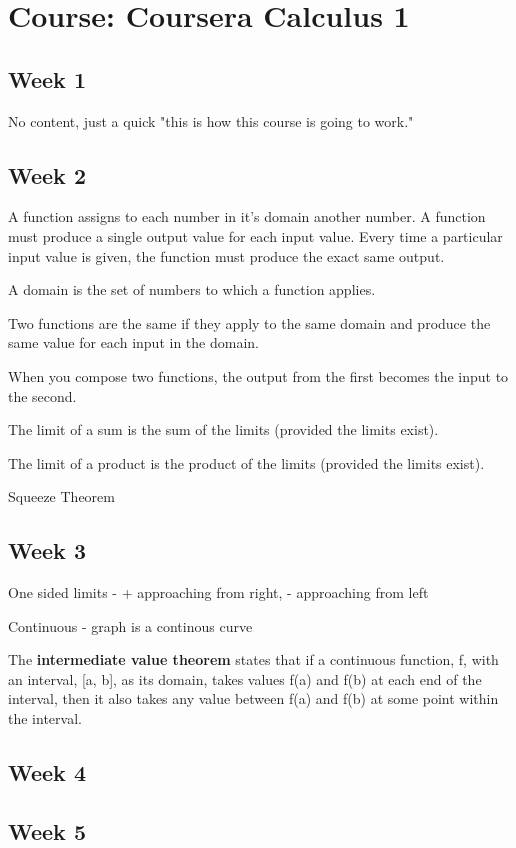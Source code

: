 \chapter{Course: Coursera Calculus 1}
\section{Week 1}
No content, just a quick "this is how this course is going to work."

\section{Week 2}

A function assigns to each number in it's domain another number. A function must produce a single output value for each input value. Every time a particular input value is given, the function must produce the exact same output.

A domain is the set of numbers to which a function applies.

Two functions are the same if they apply to the same domain and produce the same value for each input in the domain.

When you compose two functions, the output from the first becomes the input to the second.

The limit of a sum is the sum of the limits (provided the limits exist).

The limit of a product is the product of the limits (provided the limits exist).

Squeeze Theorem 

\section{Week 3}

One sided limits - + approaching from right, - approaching from left

Continuous - graph is a continous curve

The \textbf{intermediate value theorem} states that if a continuous function, f, with an interval, [a, b], as its domain, takes values f(a) and f(b) at each end of the interval, then it also takes any value between f(a) and f(b) at some point within the interval.


\section{Week 4}
\section{Week 5}
